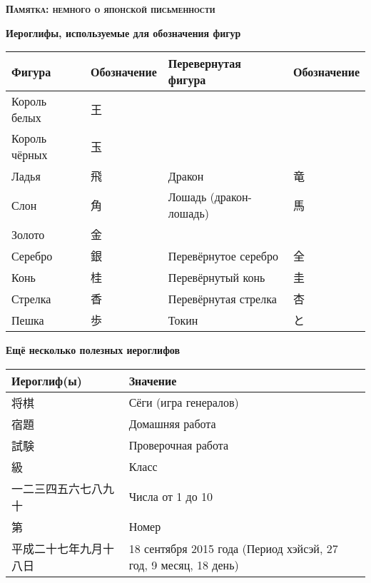 \documentclass[10pt]{scrartcl}
\begin{document}
\begin{CJK}{UTF8}{min}
\begin{center}{\bfseries\Large\scshape Памятка: немного о японской письменности}\\
\end{center}

\vspace{0.2cm}


\begin{center}{\bfseries Иероглифы, используемые для обозначения фигур}
\vspace{2mm}

\begin{tabular}{|l|l|l|l|}
\hline
Фигура & Обозначение & Перевернутая фигура & Обозначение\\\hline
Король белых & 王&&\\\hline
Король чёрных & 玉&&\\\hline
Ладья & 飛& Дракон & 竜\\\hline
Слон & 角& Лошадь (дракон-лошадь) & 馬\\\hline
Золото & 金&&\\\hline
Серебро & 銀& Перевёрнутое серебро & 全\\\hline
Конь & 桂& Перевёрнутый конь & 圭\\\hline
Стрелка & 香& Перевёрнутая стрелка & 杏\\\hline
Пешка & 歩& Токин & と\\\hline
\end{tabular}\end{center}

\vspace{3mm}

\begin{center}{\bfseries Ещё несколько полезных иероглифов}
\vspace{2mm}

\begin{tabular}{|l|l|}
\hline
Иероглиф(ы) & Значение\\\hline
将棋 & Сёги (игра генералов)\\\hline
宿題  & Домашняя работа\\\hline
試験 & Проверочная работа\\\hline
級 & Класс\\\hline
一二三四五六七八九十 & Числа от 1 до 10\\\hline
第 & Номер\\\hline
平成二十七年九月十八日 & 18 сентября 2015 года (Период хэйсэй, 27 год, 9 месяц, 18 день)%
\\\hline
\end{tabular}\end{center}


\end{CJK}
\end{document}
